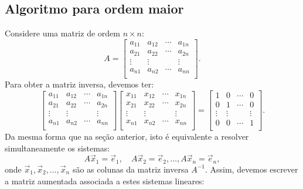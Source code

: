\subsection{Algoritmo para ordem maior}\label{scn:alg-ordem-maior}

Considere uma matriz de ordem $n \times n$:
\begin{equation}
A =
\left[
\begin{array}{cccc}
a_{11} & a_{12} & \cdots & a_{1n} \\
a_{21} & a_{22} & \cdots & a_{2n} \\
\vdots & \vdots &        & \vdots \\
a_{n1} & a_{n2} & \cdots & a_{nn} \\
\end{array}
\right].
\end{equation} Para obter a matriz inversa, devemos ter:
\begin{equation}
\left[
\begin{array}{cccc}
a_{11} & a_{12} & \cdots & a_{1n} \\
a_{21} & a_{22} & \cdots & a_{2n} \\
\vdots & \vdots &        & \vdots \\
a_{n1} & a_{n2} & \cdots & a_{nn} \\
\end{array}
\right]
\left[
\begin{array}{cccc}
x_{11} & x_{12} & \cdots & x_{1n} \\
x_{21} & x_{22} & \cdots & x_{2n} \\
\vdots & \vdots &        & \vdots \\
x_{n1} & x_{n2} & \cdots & x_{nn} \\
\end{array}
\right]
=
\left[
\begin{array}{cccc}
1   &    0   & \cdots &    0   \\
0   &    1   & \cdots &    0   \\
\vdots & \vdots &        & \vdots \\
0   &    0   & \cdots &    1   \\
\end{array}
\right].
\end{equation} Da mesma forma que na seção anterior, isto é equivalente a resolver simultaneamente os sistemas:
\begin{equation}
A \vec{x}_1 = \vec{e}_1, \quad A \vec{x}_2 = \vec{e}_2, \dots, A \vec{x}_n = \vec{e}_n,
\end{equation} onde $\vec{x}_1, \vec{x}_2, \dots, \vec{x}_n$ são as colunas da matriz inversa $A^{-1}$. Assim, devemos escrever a matriz aumentada associada a estes sistemas lineares:
